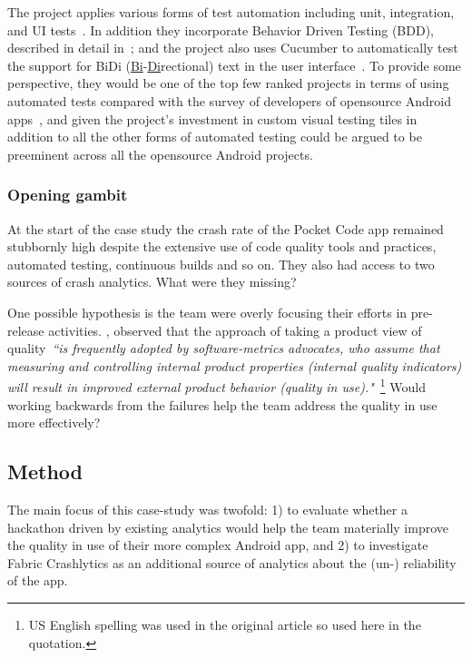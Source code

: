 The project applies various forms of test automation including unit, integration, and UI tests~\citep{luhana2018streamlining}. In addition they incorporate Behavior Driven Testing (BDD), described in detail in~\citep{ali2019using_catrobat}; and the project also uses Cucumber to automatically test the support for BiDi (\underline{Bi}-\underline{Di}rectional) text in the user interface~\citep{ayyal2016automated_bidi_testing, awwad2017_automated_bidi_testing, ali2019behavior_catrobat}. To provide some perspective, they would be one of the top few ranked projects in terms of using automated tests compared with the survey of developers of opensource Android apps~\citep{linares2017_how_do_developers_test_android_apps}, and given the project's investment in custom visual testing tiles in addition to all the other forms of automated testing could be argued to be preeminent across all the opensource Android projects. 


\subsubsection{Opening gambit}
At the start of the case study the crash rate of the Pocket Code app remained stubbornly high despite the extensive use of code quality tools and practices, automated testing, continuous builds and so on. They also had access to two sources of crash analytics. What were they missing?

One possible hypothesis is the team were overly focusing their efforts in pre-release activities. \citep{kitchenham1996_software_quality_elusive_target}, observed that the approach of taking a product view of quality~\emph{``is frequently adopted by software-metrics advocates, who assume that measuring and controlling internal product properties (internal quality indicators) will result in improved external product behavior (quality in use)."}~\footnote{US English spelling was used in the original article so used here in the quotation.} Would working backwards from the failures help the team address the quality in use more effectively?

\subsection{Method}
The main focus of this case-study was twofold: 1) to evaluate whether a hackathon driven by existing analytics would help the team materially improve the quality in use of their more complex Android app, and 2) to investigate Fabric Crashlytics as an additional source of analytics about the (un-) reliability of the app.

